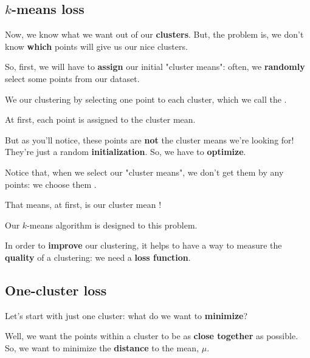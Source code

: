     \subsection{$k$-means loss}
    
        Now, we know what we want out of our \textbf{clusters}. But, the problem is, we don't know \textbf{which} points will give us our nice clusters. 
        
        So, first, we will have to \textbf{assign} our initial "cluster means": often, we \textbf{randomly} select some points from our dataset.\\
        
        \begin{concept}
            We  our clustering by  selecting one point to  each cluster, which we call the .
            
            At first, each point is assigned to the  cluster mean.
        \end{concept}
        
        But as you'll notice, these points are \textbf{not} the cluster means we're looking for! They're just a random \textbf{initialization}. So, we have to \textbf{optimize}.\\
        
        \begin{clarification}
            Notice that, when we  select our "cluster means", we don't get them by  any points: we choose them .
            
            That means, at first, is our cluster mean !
            
            Our $k$-means algorithm is designed to  this problem.
        \end{clarification}

        
        In order to \textbf{improve} our clustering, it helps to have a way to measure the \textbf{quality} of a clustering: we need a \textbf{loss function}.
    
    \subsection{One-cluster loss}
    
        Let's start with just one cluster: what do we want to \textbf{minimize}? 
        
        Well, we want the points within a cluster to be as \textbf{close together} as possible. So, we want to minimize the \textbf{distance} to the mean, $\mu$.
        
